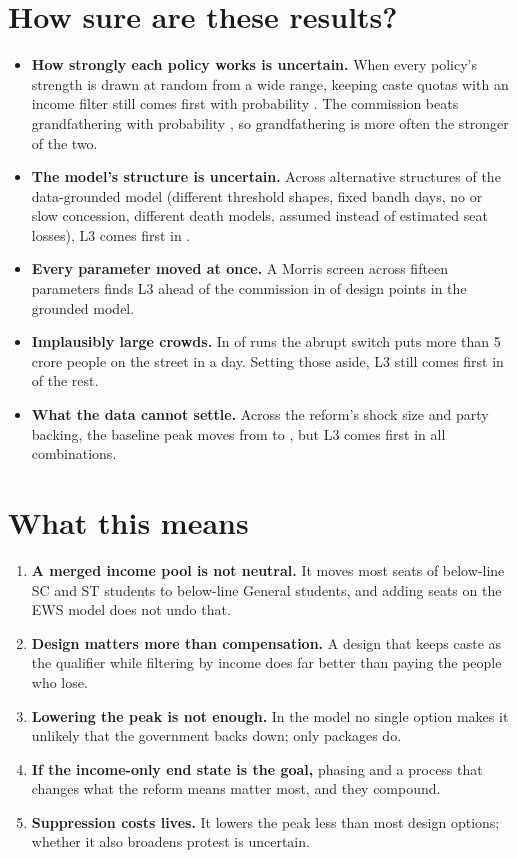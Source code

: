 \documentclass[11pt,a4paper]{article}
\begin{document}
\section{How sure are these results?}
\label{sec:robustness}
\begin{itemize}
\item \textbf{How strongly each policy works is uncertain.} When every policy's strength is drawn at random from a wide range, keeping caste quotas with an income filter still comes first with probability \MapGroundedStrongestLThree. The commission beats grandfathering with probability \MapGroundedLFiveBeatsLOne{}, so grandfathering is more often the stronger of the two.
\item \textbf{The model's structure is uncertain.} Across \GEnsembleVariants{} alternative structures of the data-grounded model (different threshold shapes, fixed bandh days, no or slow concession, different death models, assumed instead of estimated seat losses), L3 comes first in \GEnsembleLThreeStrongest.
\item \textbf{Every parameter moved at once.} A Morris screen across fifteen parameters finds L3 ahead of the commission in \MorrisGroundedLThreeBeatsLFive{} of design points in the grounded model.
\item \textbf{Implausibly large crowds.} In \PlausibleShareBaselineAboveFiveCrore{} of runs the abrupt switch puts more than 5 crore people on the street in a day. Setting those aside, L3 still comes first in \PlausibleLThreeFirstBelowFiveCrore{} of the rest.
\item \textbf{What the data cannot settle.} Across the reform's shock size and party backing, the baseline peak moves from \AssumptionPeakLow{} to \AssumptionPeakHigh{}, but L3 comes first in all \AssumptionCells{} combinations.
\end{itemize}

\section{What this means}
\begin{enumerate}
\item \textbf{A merged income pool is not neutral.} It moves most seats of below-line SC and ST students to below-line General students, and adding seats on the EWS model does not undo that.
\item \textbf{Design matters more than compensation.} A design that keeps caste as the qualifier while filtering by income does far better than paying the people who lose.
\item \textbf{Lowering the peak is not enough.} In the model no single option makes it unlikely that the government backs down; only packages do.
\item \textbf{If the income-only end state is the goal,} phasing and a process that changes what the reform means matter most, and they compound.
\item \textbf{Suppression costs lives.} It lowers the peak less than most design options; whether it also broadens protest is uncertain.
\end{enumerate}
\end{document}
